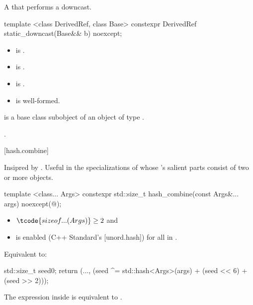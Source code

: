 \pnum
A  that performs a downcast.

%
\begin{itemdecl}
template <class DerivedRef, class Base>
constexpr DerivedRef static_downcast(Base&& b) noexcept;
\end{itemdecl}

\begin{itemdescr}
\pnum
\constraints
\begin{itemize}
\item
   is .
\item
  is .
\item
  is .
\item
   is well-formed.
\end{itemize}

\pnum
\expects
{} is a base class subobject
of an object of type .

\pnum
\returns
{}.
\end{itemdescr}

[hash.combine]{}

\pnum
Insipred by .
Useful in the specializations of 
whose 's salient parts consist of two or more objects.

%
\begin{itemdecl}
template <class... Args>
constexpr std::size_t hash_combine(const Args&... args) noexcept(@\seebelow@);
\end{itemdecl}

\begin{itemdescr}
\pnum
\constraints
\begin{itemize}
\item
  $\tcode{sizeof...(Args)} \geq 2$ and
\item
   is enabled (C++ Standard's [unord.hash])
  for all  in .
\end{itemize}

\pnum
\effects
Equivalent to:
\begin{codeblock}
std::size_t seed{0};
return (..., (seed ^= std::hash<Args>{}(args) + (seed << 6) + (seed >> 2)));
\end{codeblock}

\pnum
\remarks
The expression inside  is equivalent to
.
\end{itemdescr}
